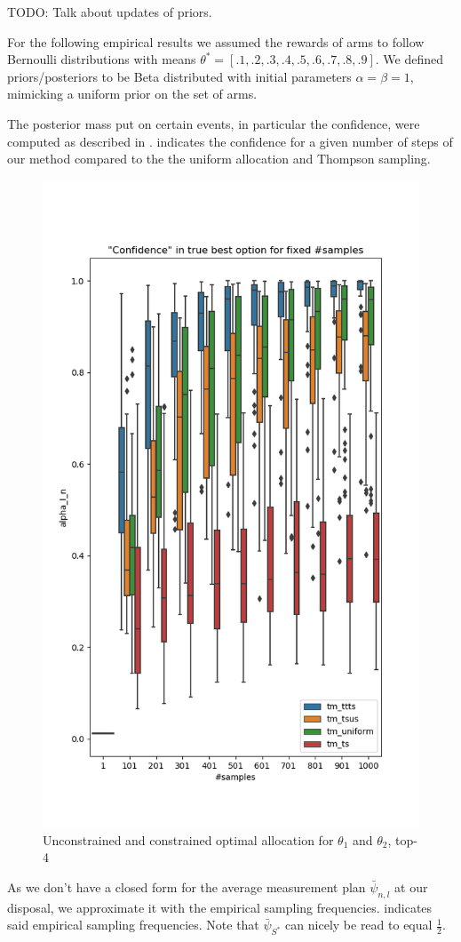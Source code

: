 TODO: Talk about updates of priors.

For the following empirical results we assumed the rewards of arms to follow
Bernoulli distributions with means $\theta^* = [.1, .2, .3, .4, .5, .6, .7, .8,
.9]$. We defined priors/posteriors to be Beta distributed with initial
parameters $\alpha = \beta = 1$, mimicking a uniform prior on the set of arms.

The posterior mass put on certain events, in particular the confidence, were
computed as described in . 
indicates the confidence for a given number of steps of our method compared to
the the uniform allocation and Thompson sampling.
\begin{figure}[h]
  \centering
  \includegraphics[width=.5\textwidth]{190723-confidences.png}
  \caption{Unconstrained and constrained optimal allocation for $\theta_1$ and $\theta_2$, top-4}
  \label{fig:confidences}
\end{figure}
As we don't have a closed form for the average measurement plan
$\bar{\psi}_{n,l}$ at our disposal, we approximate it with the empirical
sampling frequencies.  indicates said empirical
sampling frequencies. Note that $\bar{\psi}_{S^*}$ can nicely be read to equal
$\frac{1}{2}$.
